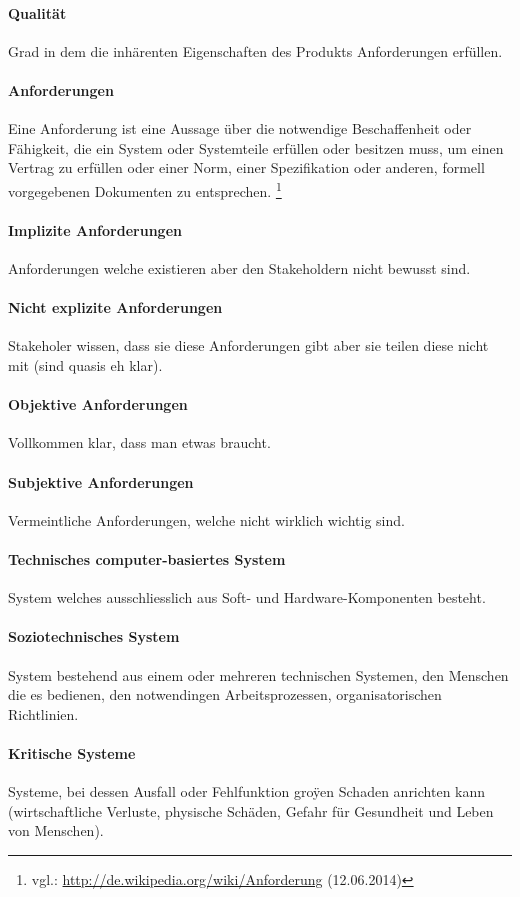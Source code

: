 \paragraph{Qualität}
Grad in dem die inhärenten Eigenschaften des Produkts Anforderungen erfüllen.
\paragraph{Anforderungen}
Eine Anforderung ist eine Aussage über die notwendige Beschaffenheit oder Fähigkeit, die ein System oder Systemteile erfüllen oder besitzen muss, um einen Vertrag zu erfüllen oder einer Norm, einer Spezifikation oder anderen, formell vorgegebenen Dokumenten zu entsprechen. \footnote{vgl.: \url{http://de.wikipedia.org/wiki/Anforderung} (12.06.2014)}
\paragraph{Implizite Anforderungen}
Anforderungen welche existieren aber den Stakeholdern nicht bewusst sind.
\paragraph{Nicht explizite Anforderungen}
Stakeholer wissen, dass sie diese Anforderungen gibt aber sie teilen diese nicht mit (sind quasis eh klar).
\paragraph{Objektive Anforderungen}
Vollkommen klar, dass man etwas braucht.
\paragraph{Subjektive Anforderungen}
Vermeintliche Anforderungen, welche nicht wirklich wichtig sind.
\paragraph{Technisches computer-basiertes System}
System welches ausschliesslich aus Soft- und Hardware-Komponenten besteht.
\paragraph{Soziotechnisches System}
System bestehend aus einem oder mehreren technischen Systemen,
den Menschen die es bedienen, den notwendingen Arbeitsprozessen, organisatorischen Richtlinien.
\paragraph{Kritische Systeme}
Systeme, bei dessen Ausfall oder Fehlfunktion groÿen Schaden anrichten kann (wirtschaftliche Verluste, physische Schäden, Gefahr für Gesundheit und Leben von Menschen).
